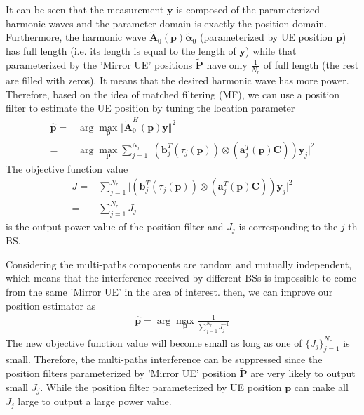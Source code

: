 \documentclass[journal]{IEEEtran}
\def \arg{\operatorname{arg}}
\begin{document}
It can be seen that the measurement $\boldsymbol{y}$ is composed of the parameterized harmonic waves and the parameter domain is exactly the position domain.
Furthermore, the harmonic wave $\tilde{\boldsymbol{A}}_0(\boldsymbol{p})\tilde{\boldsymbol{\alpha}}_0$ (parameterized by UE position $\boldsymbol{p}$) has full length (i.e. its length is equal to the length of $\boldsymbol{y}$) 
while that parameterized by the 'Mirror UE' positions $\tilde{\boldsymbol{P}}$ have only $\frac{1}{N_r}$ of full length (the rest are filled with zeros). It means that the desired harmonic wave has more power.
Therefore, based on the idea of matched filtering (MF), we can use a position filter to estimate the UE position by tuning the location parameter
\begin{align}\label{dpd-MF}
  \hat{\boldsymbol{p}}=&\arg \max_{\boldsymbol{p}} \Vert \tilde{\boldsymbol{A}}_0^H(\boldsymbol{p})\boldsymbol{y} \Vert^2\\\nonumber
                      =&\arg \max_{\boldsymbol{p}}\sum_{j=1}^{N_r}\vert (\boldsymbol{b}^T_j(\tau_j(\boldsymbol{p}))\otimes (\boldsymbol{a}^T_j(\boldsymbol{p})\boldsymbol{C}))\boldsymbol{y}_j \vert^2
\end{align}
The objective function value 
\begin{align}\label{ObFunc}
  J=&\sum_{j=1}^{N_r} \vert (\boldsymbol{b}^T_j(\tau_j(\boldsymbol{p}))\otimes (\boldsymbol{a}^T_j(\boldsymbol{p})\boldsymbol{C}))\boldsymbol{y}_j \vert^2\\\nonumber
   =&\sum_{j=1}^{N_r} J_j
\end{align}
is the output power value of the position filter and $J_j$ is corresponding to the $j$-th BS. 

Considering the multi-paths components are random and mutually independent, which means that the interference received by different BSs is impossible to come from the same 'Mirror UE' in the area of interest. then, we can improve our position estimator as
\begin{align}\label{Iprvdpd-MF}
  \hat{\boldsymbol{p}}=\arg \max_{\boldsymbol{p}} \frac{1}{\sum_{j=1}^{N_r}J_j^{-1}}
\end{align}
The new objective function value will become small as long as one of $\{J_j\}_{j=1}^{N_r}$ is small.
Therefore, the multi-paths interference can be suppressed since the position filters parameterized by 'Mirror UE' position $\tilde{\boldsymbol{P}}$ are very likely to output small $J_j$.
While the position filter parameterized by UE position $\boldsymbol{p}$ can make all $J_j$ large to output a large power value.
\end{document}
